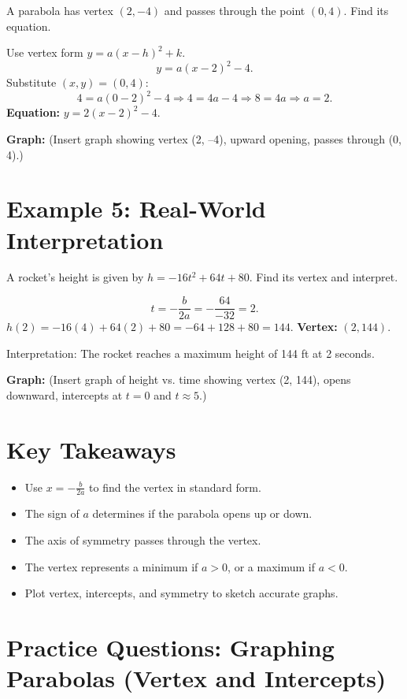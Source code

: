 \documentclass[12pt]{article}
\begin{document}
A parabola has vertex \((2, -4)\) and passes through the point \((0, 4)\).  
Find its equation.

Use vertex form \(y = a(x - h)^2 + k.\)
\[
y = a(x - 2)^2 - 4.
\]
Substitute \((x, y) = (0, 4):\)
\[
4 = a(0 - 2)^2 - 4 \Rightarrow 4 = 4a - 4 \Rightarrow 8 = 4a \Rightarrow a = 2.
\]
\textbf{Equation:} \(\boxed{y = 2(x - 2)^2 - 4.}\)

\textbf{Graph:} (Insert graph showing vertex (2, –4), upward opening, passes through (0, 4).)

\section*{Example 5: Real-World Interpretation}

A rocket’s height is given by \(h = -16t^2 + 64t + 80.\)  
Find its vertex and interpret.

\[
t = -\frac{b}{2a} = -\frac{64}{-32} = 2.
\]
\(h(2) = -16(4) + 64(2) + 80 = -64 + 128 + 80 = 144.\)
\textbf{Vertex:} \((2, 144)\).

Interpretation: The rocket reaches a maximum height of 144 ft at 2 seconds.

\textbf{Graph:} (Insert graph of height vs. time showing vertex (2, 144), opens downward, intercepts at \(t = 0\) and \(t \approx 5.\))

\section*{Key Takeaways}
\begin{itemize}
  \item Use \(x = -\frac{b}{2a}\) to find the vertex in standard form.
  \item The sign of \(a\) determines if the parabola opens up or down.
  \item The axis of symmetry passes through the vertex.
  \item The vertex represents a minimum if \(a > 0\), or a maximum if \(a < 0.\)
  \item Plot vertex, intercepts, and symmetry to sketch accurate graphs.
\end{itemize}

\newpage


\section*{Practice Questions: Graphing Parabolas (Vertex and Intercepts)}
\end{document}
